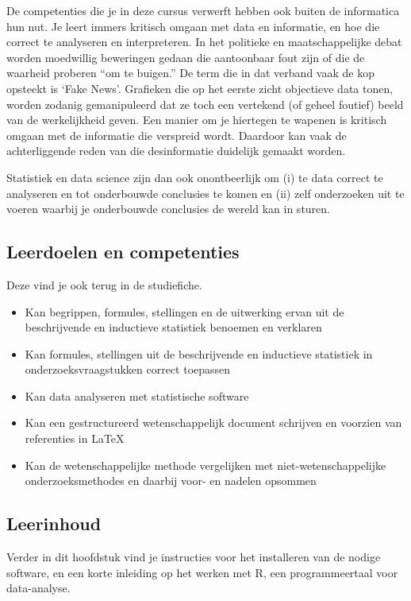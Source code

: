 De competenties die je in deze cursus verwerft hebben ook buiten de informatica hun nut. Je leert immers kritisch omgaan met data en informatie, en hoe die correct te analyseren en interpreteren. In het politieke en maatschappelijke debat worden moedwillig beweringen gedaan die aantoonbaar fout zijn of die de waarheid proberen ``om te buigen.'' De term die in dat verband vaak de kop opsteekt is `Fake News'. Grafieken die op het eerste zicht objectieve data tonen, worden zodanig gemanipuleerd dat ze toch een vertekend (of geheel foutief) beeld van de werkelijkheid geven. Een manier om je hiertegen te wapenen is kritisch omgaan met de informatie die verspreid wordt. Daardoor kan vaak de achterliggende reden van die desinformatie duidelijk gemaakt worden.

Statistiek  en data science zijn dan ook onontbeerlijk om (i) te data correct te analyseren en tot onderbouwde conclusies te komen en (ii) zelf onderzoeken uit te voeren waarbij je onderbouwde conclusies de wereld kan in sturen.

\subsection{Leerdoelen en competenties}

Deze vind je ook terug in de studiefiche.

\begin{itemize}
  \item Kan begrippen, formules, stellingen en de uitwerking ervan uit de beschrijvende en inductieve statistiek benoemen en verklaren
  \item Kan formules, stellingen uit de beschrijvende en inductieve statistiek in onderzoeksvraagstukken correct toepassen
  \item Kan data analyseren met statistische software
  \item Kan een gestructureerd wetenschappelijk document schrijven en voorzien van referenties in \LaTeX{}
  \item Kan de wetenschappelijke methode vergelijken met niet-wetenschappelijke onderzoeksmethodes en daarbij voor- en nadelen opsommen
\end{itemize}

\subsection{Leerinhoud}

Verder in dit hoofdstuk vind je instructies voor het installeren van de nodige software, en een korte inleiding op het werken met R, een programmeertaal voor data-analyse.


